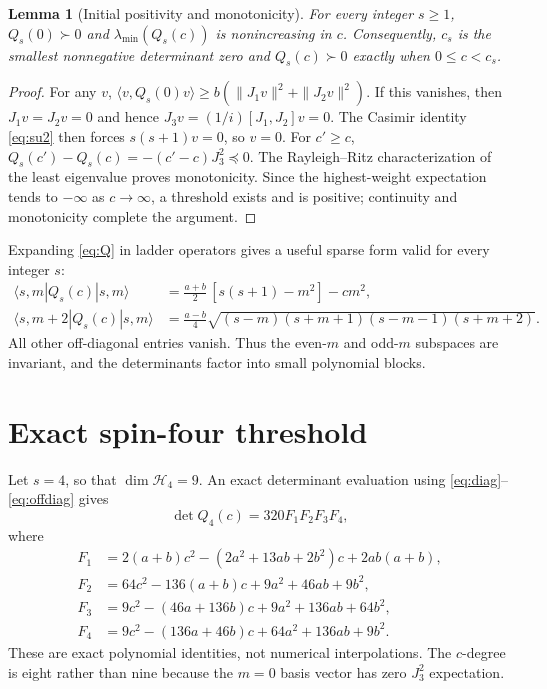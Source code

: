 \documentclass[11pt,a4paper]{article}
\newtheorem{lemma}[theorem]{Lemma}
\begin{document}
\begin{lemma}[Initial positivity and monotonicity]\label{lem:monotone}
For every integer $s\geq1$, $Q_s(0)\succ0$ and
$\lambda_{\min}(Q_s(c))$ is nonincreasing in $c$. Consequently,
$c_s$ is the smallest nonnegative determinant zero and
$Q_s(c)\succ0$ exactly when $0\leq c<c_s$.
\end{lemma}
\begin{proof}
For any $v$,
$\langle v,Q_s(0)v\rangle\geq
b(\|J_1v\|^2+\|J_2v\|^2)$.
If this vanishes, then $J_1v=J_2v=0$ and hence
$J_3v=(1/i)[J_1,J_2]v=0$. The Casimir identity
\eqref{eq:su2} then forces $s(s+1)v=0$, so $v=0$.
For $c'\geq c$, $Q_s(c')-Q_s(c)=-(c'-c)J_3^2\preceq0$.
The Rayleigh--Ritz characterization of the least eigenvalue
proves monotonicity. Since the highest-weight expectation tends
to $-\infty$ as $c\to\infty$, a threshold exists and is
positive; continuity and monotonicity complete the argument.
\end{proof}

Expanding \eqref{eq:Q} in ladder operators gives a useful sparse
form valid for every integer $s$:
\begin{align}
\langle s,m|Q_s(c)|s,m\rangle
 &=\frac{a+b}{2}\,[s(s+1)-m^2]-cm^2,\label{eq:diag}\\
\langle s,m+2|Q_s(c)|s,m\rangle
 &=\frac{a-b}{4}
\sqrt{(s-m)(s+m+1)(s-m-1)(s+m+2)}.\label{eq:offdiag}
\end{align}
All other off-diagonal entries vanish. Thus the even-$m$ and odd-$m$
subspaces are invariant, and the determinants factor into small
polynomial blocks.

\section{Exact spin-four threshold}\label{sec:spin4}
Let $s=4$, so that $\dim\mathcal H_4=9$.
An exact determinant evaluation using \eqref{eq:diag}--\eqref{eq:offdiag}
gives
\begin{equation}\label{eq:det4}
\det Q_4(c)=320F_1F_2F_3F_4,
\end{equation}
where
\begin{align}
F_1&=2(a+b)c^2-(2a^2+13ab+2b^2)c+2ab(a+b),\label{eq:F1}\\
F_2&=64c^2-136(a+b)c+9a^2+46ab+9b^2,\label{eq:F2}\\
F_3&=9c^2-(46a+136b)c+9a^2+136ab+64b^2,\label{eq:F3}\\
F_4&=9c^2-(136a+46b)c+64a^2+136ab+9b^2.\label{eq:F4}
\end{align}
These are exact polynomial identities, not numerical interpolations.
The $c$-degree is eight rather than nine because the $m=0$ basis
vector has zero $J_3^2$ expectation.
\end{document}
